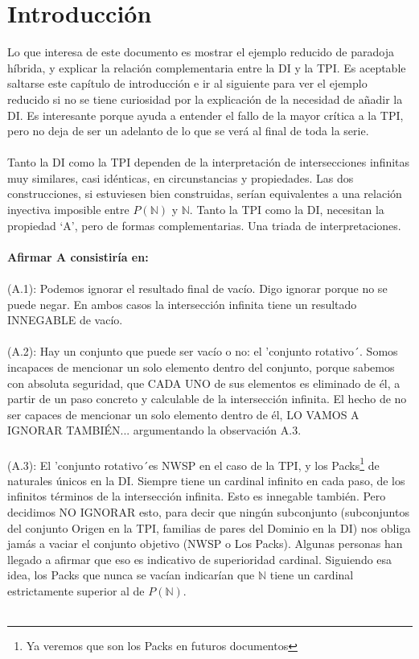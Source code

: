 \chapter{Introducción}
	
	\noindent
	Lo que interesa de este documento es mostrar el ejemplo reducido de paradoja híbrida, y explicar la relación complementaria entre la DI y la TPI. Es aceptable saltarse este capítulo de introducción e ir al siguiente para ver el ejemplo reducido si no se tiene curiosidad por la explicación de la necesidad de añadir la DI. Es interesante porque ayuda a entender el fallo de la mayor crítica a la TPI, pero no deja de ser un adelanto de lo que se verá al final de toda la serie.\\\\
	
	\noindent 
	Tanto la DI como la TPI dependen de la interpretación de intersecciones infinitas muy similares, casi idénticas, en circunstancias y propiedades. Las dos construcciones, si estuviesen bien construidas, serían equivalentes a una relación inyectiva imposible entre $P(\mathbb{N})$ y $\mathbb{N}$. Tanto la TPI como la DI, necesitan la propiedad `A', pero de formas complementarias. Una triada de interpretaciones.\\\\
	
	\noindent
	\textbf{Afirmar A consistiría en:}\\\\
	(A.1): Podemos ignorar el resultado final de vacío. Digo ignorar porque no se puede negar. En ambos casos la intersección infinita tiene un resultado INNEGABLE de vacío.\\\\
	(A.2): Hay un conjunto que puede ser vacío o no: el 'conjunto rotativo´. Somos incapaces de mencionar un solo elemento dentro del conjunto, porque sabemos con absoluta seguridad, que CADA UNO de sus elementos es eliminado de él, a partir de un paso concreto y calculable de la intersección infinita. El hecho de no ser capaces de mencionar un solo elemento dentro de él, LO VAMOS A IGNORAR TAMBIÉN... argumentando la observación A.3.\\\\
	(A.3): El 'conjunto rotativo´es NWSP en el caso de la TPI, y los Packs\footnote{Ya veremos que son los Packs en futuros documentos} de naturales únicos en la DI. Siempre tiene un cardinal infinito en cada paso, de los infinitos términos de la intersección infinita. Esto es innegable también. Pero decidimos NO IGNORAR esto, para decir que ningún subconjunto (subconjuntos del conjunto Origen en la TPI, familias de pares del Dominio en la DI) nos obliga jamás a vaciar el conjunto objetivo (NWSP o Los Packs). Algunas personas han llegado a afirmar que eso es indicativo de superioridad cardinal. Siguiendo esa idea, los Packs que nunca se vacían indicarían que $\mathbb{N}$ tiene un cardinal estrictamente superior al de $P(\mathbb{N})$.\\\\
	
